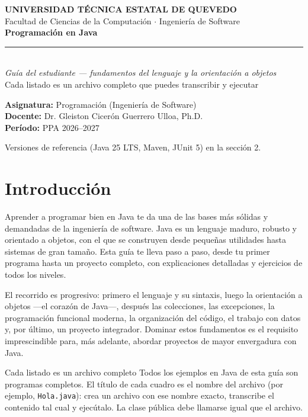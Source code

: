 \documentclass[11pt]{article}
\begin{document}
\begin{titlepage}
\vspace*{1.2cm}
{\color{javaazul}\bfseries\large UNIVERSIDAD T\'ECNICA ESTATAL DE QUEVEDO}\\[2pt]
{\color{gray} Facultad de Ciencias de la Computaci\'on $\cdot$ Ingenier\'ia de Software}\\[2.2cm]
{\color{tinta}\bfseries\fontsize{32}{36}\selectfont Programaci\'on en Java}\\[8pt]
{\color{javaoro}\rule{\linewidth}{2.2pt}}\\[10pt]
{\itshape\large Gu\'ia del estudiante --- fundamentos del lenguaje y la orientaci\'on a objetos}\\[4pt]
{\color{gray} Cada listado es un archivo completo que puedes transcribir y ejecutar}\\[3cm]
\begin{flushleft}
\textbf{Asignatura:} Programaci\'on (Ingenier\'ia de Software)\\[3pt]
\textbf{Docente:} Dr. Gleiston Cicer\'on Guerrero Ulloa, Ph.D.\\[3pt]
\textbf{Per\'iodo:} PPA 2026--2027
\end{flushleft}
\vfill
{\color{gray}\small Versiones de referencia (Java 25 LTS, Maven, JUnit 5) en la secci\'on 2.}
\end{titlepage}
\tableofcontents
\clearpage
\section{Introducción}
Aprender a programar bien en Java te da una de las bases más sólidas y demandadas de la ingeniería de software. Java es un lenguaje maduro, robusto y orientado a objetos, con el que se construyen desde pequeñas utilidades hasta sistemas de gran tamaño. Esta guía te lleva paso a paso, desde tu primer programa hasta un proyecto completo, con explicaciones detalladas y ejercicios de todos los niveles.

El recorrido es progresivo: primero el lenguaje y su sintaxis, luego la orientación a objetos —el corazón de Java—, después las colecciones, las excepciones, la programación funcional moderna, la organización del código, el trabajo con datos y, por último, un proyecto integrador. Dominar estos fundamentos es el requisito imprescindible para, más adelante, abordar proyectos de mayor envergadura con Java.

\begin{cajatip}{Cada listado es un archivo completo}
Todos los ejemplos en Java de esta guía son programas completos. El título de cada cuadro es el nombre del archivo (por ejemplo, \texttt{Hola.\allowbreak{}java}): crea un archivo con ese nombre exacto, transcribe el contenido tal cual y ejecútalo. La clase pública debe llamarse igual que el archivo.\par
\end{cajatip}
\end{document}
